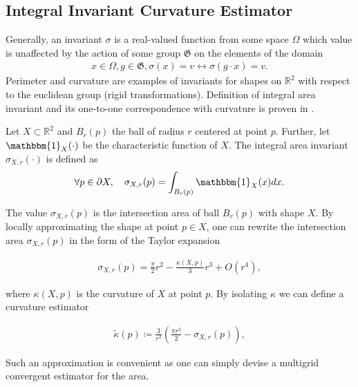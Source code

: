 \documentclass[runningheads]{llncs}
\begin{document}
\subsection{Integral Invariant Curvature Estimator}
Generally, an invariant $\sigma$ is a real-valued function from some space $\Omega$ which value is unaffected by the action
of some group $\mathfrak{G}$ on the elements of the domain
\begin{align*}
  x \in \Omega, g \in \mathfrak{G}, \sigma(x) = v \longleftrightarrow \sigma(g \cdot x ) = v.
\end{align*}
Perimeter and curvature are examples of invariants for shapes on $\mathbb{R}^2$ with respect to the euclidean group
(rigid transformations). Definition of integral area invariant and its one-to-one correspondence with curvature is
proven in \cite{manay04intinvariant}.


\begin{definition}
  Let $X \subset \mathbb{R}^2$ and $B_r(p)$ the ball of radius $r$ centered at point $p$. Further, let
  $\mathbbm{1}_X(\cdot)$ be the characteristic function of $X$. The integral area invariant $\sigma_{X,r}(\cdot)$ is
  defined as
  \begin{align*}
    \forall p \in \partial X, \quad \sigma_{X,r}(p) = \int_{B_r(p)}{ \mathbbm{1}_X(x) dx}.
  \end{align*}
\end{definition}


The value $\sigma_{X,r}(p)$ is the intersection area of ball $B_r(p)$ with shape $X$. By locally approximating the shape
at point $p \in X$, one can rewrite the intersection area $\sigma_{X,r}(p)$ in the form of the Taylor expansion
\cite{pottman09intinvariant}
	
\begin{align*}
  \sigma_{X,r}(p) = \frac{\pi}{2}r^2 - \frac{\kappa(X,p)}{3}r^3 + O(r^4),
\end{align*}
		
where $\kappa(X,p)$ is the curvature of $X$ at point $p$. By isolating $\kappa$ we can define a curvature estimator
	
\begin{align}
  \tilde{\kappa}(p) \coloneqq \frac{3}{r^3}\left( \frac{\pi r^2}{2} - \sigma_{X,r}(p) \right),
  \label{eq:curvature_approximation}
\end{align}
	
Such an approximation is convenient as one can simply devise a multigrid convergent estimator for the area.
\end{document}
